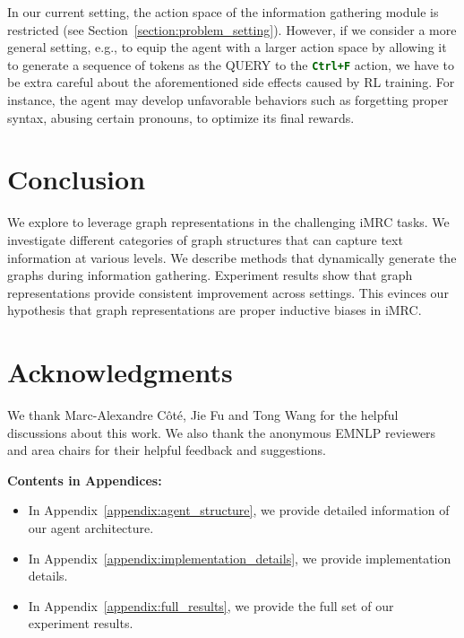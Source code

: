 \documentclass[11pt]{article}
\newcommand{\code}[1]{\texttt{#1}}
\newcommand{\cmd}[1]{\textcolor{darkgreen}{\textbf{\small{\code{#1}}}}}
\newcommand{\imrc}{iMRC\xspace}
\newcommand{\ctrlf}{Ctrl+F\xspace}
\newcommand{\query}{\textcolor{orange2}{\small{QUERY}}\xspace}
\begin{document}
In our current setting, the action space of the information gathering module is restricted (see Section~\ref{section:problem_setting}). 
However, if we consider a more general setting, e.g., to equip the agent with a larger action space by allowing it to generate a sequence of tokens as the \query to the \cmd{\ctrlf} action, we have to be extra careful about the aforementioned side effects caused by RL training.
For instance, the agent may develop unfavorable behaviors such as forgetting proper syntax, abusing certain pronouns, to optimize its final rewards. 



\section{Conclusion}
\label{section:conclusion}
We explore to leverage graph representations in the challenging \imrc tasks.
We investigate different categories of graph structures that can capture text information at various levels.
We describe methods that dynamically generate the graphs during information gathering.
Experiment results show that graph representations provide consistent improvement across settings. 
This evinces our hypothesis that graph representations are proper inductive biases in \imrc.


\section*{Acknowledgments}
We thank Marc-Alexandre C\^ot\'{e}, 
Jie Fu and
Tong Wang for the helpful discussions about this work.
We also thank the anonymous EMNLP reviewers and area chairs for their helpful feedback and suggestions.




%


\clearpage
\appendix


\textbf{\large{Contents in Appendices:}}
\begin{itemize}
    \item In Appendix~\ref{appendix:agent_structure}, we provide detailed information of our agent architecture.
    \item In Appendix~\ref{appendix:implementation_details}, we provide implementation details.
    \item In Appendix~\ref{appendix:full_results}, we provide the full set of our experiment results.
\end{itemize}
\end{document}
